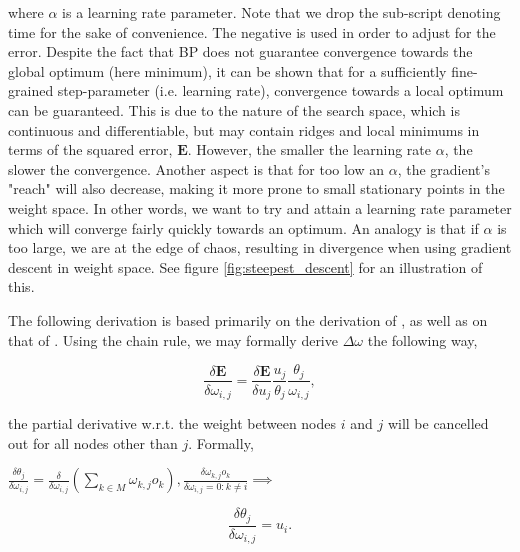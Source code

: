 where $\alpha$ is a learning rate parameter. Note that we drop the sub-script denoting time for the sake of convenience.
The negative is used in order to adjust for the error. Despite the fact that BP does not guarantee convergence towards the global optimum (here minimum), it can be shown that for a sufficiently fine-grained step-parameter (i.e. learning rate), convergence towards a local optimum can be guaranteed. This is due to the nature of the search space, which is continuous and differentiable, but may contain ridges and local minimums in terms of the squared error, $\textbf{E}$. However, the smaller the learning rate $\alpha$, the slower the convergence. Another aspect is that for too low an $\alpha$, the gradient's "reach" will also decrease, making it more prone to small stationary points in the weight space. In other words, we want to try and attain a learning rate parameter which will converge fairly quickly towards an optimum. An analogy is that if $\alpha$ is too large, we are at the edge of chaos, resulting in divergence when using gradient descent in weight space. See figure \ref{fig:steepest_descent} for an illustration of this.

The following derivation is based primarily on the derivation of \cite{Rumelhart1986}, as well as on that of \cite{Russell2009}.
Using the chain rule, we may formally derive $\Delta \omega$ the following way,

\begin{equation}
    \frac{\delta \textbf{E}}{\delta \omega_{i,j}} = \frac{\delta \textbf{E}}{\delta u_j}
    \frac{u_j}{\theta_{j}}
    \frac{\theta_{j}}{\omega_{i,j}},
\end{equation}

the partial derivative w.r.t. the weight between nodes $i$ and $j$ will be cancelled out for all nodes other than $j$. Formally,

\begin{center}
\begin{math}
    \frac{\delta \theta_j}{\delta \omega_{i,j}} = \frac{\delta}{\delta \omega_{i,j}}(\sum_{k \in M}{} \omega_{k,j}o_k),
    \frac{\delta \omega_{k,j}o_k}{\delta \omega_{i,j} = 0 : k \neq i}
    \implies
\end{math}
\end{center}

\begin{equation}\label{delta_theta}
    \frac{\delta \theta_j}{\delta \omega_{i,j}} = u_i.
\end{equation}

